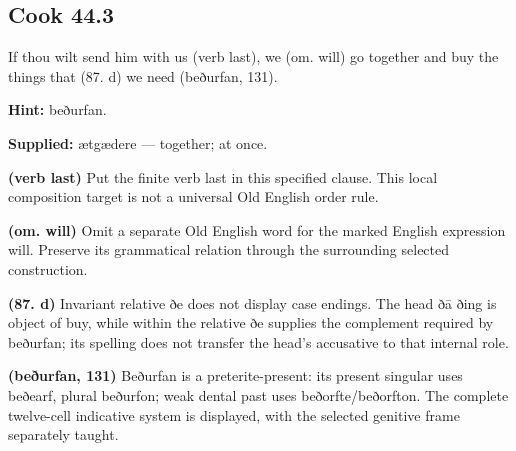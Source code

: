 \par\begin{minipage}{\linewidth}\raggedright
\subsection*{Cook 44.3}

If thou wilt send him with us (verb last), we (om. will) go together and buy the things that (87. d) we need (beðurfan, 131).

\textbf{Hint:} beðurfan.

\textbf{Supplied:} ætgædere — together; at once.

\textbf{(verb last)} Put the finite verb last in this specified clause. This local composition target is not a universal Old English order rule.

\textbf{(om. will)} Omit a separate Old English word for the marked English expression will. Preserve its grammatical relation through the surrounding selected construction.

\textbf{(87. d)} Invariant relative ðe does not display case endings. The head ðā ðing is object of buy, while within the relative ðe supplies the complement required by beðurfan; its spelling does not transfer the head’s accusative to that internal role.

\textbf{(beðurfan, 131)} Beðurfan is a preterite-present: its present singular uses beðearf, plural beðurfon; weak dental past uses beðorfte/\allowbreak{}beðorfton. The complete twelve-cell indicative system is displayed, with the selected genitive frame separately taught.

\end{minipage}\par\addvspace{4pt}

